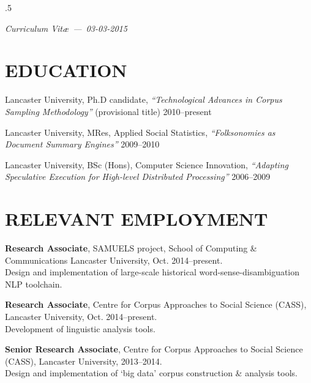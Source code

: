 \documentclass{res}
\begin{document}
\thispagestyle{empty} %
\address{\\
\texttt{<steve@stephenwattam.com>}\\
\texttt{http://stephenwattam.com/}}


\begin{resume}
\vspace{0.2in}
\moveleft.5\sectionwidth\centerline{\it Curriculum Vit\ae~---~03-03-2015}

\section{EDUCATION}
\vspace{0.1in}

    Lancaster University, Ph.D candidate,
    \textit{``Technological Advances in Corpus Sampling Methodology''} (provisional title)
    2010--present

    Lancaster University, MRes,
    Applied Social Statistics,
    \textit{``Folksonomies as Document Summary \mbox{Engines}''}
    2009--2010

    Lancaster University, BSc (Hons),
    Computer Science Innovation,
    \textit{``Adapting Speculative Execution for High-level Distributed Processing''}
    2006--2009



\section{RELEVANT EMPLOYMENT}
\vspace{0.1in}


    {\bf Research Associate},
    SAMUELS project, School of Computing \& Communications
    Lancaster University,
    Oct. 2014--present.\\
    Design and implementation of large-scale historical word-sense-disambiguation NLP toolchain.


    {\bf Research Associate},
    Centre for Corpus Approaches to Social Science (CASS),
    Lancaster University,
    Oct. 2014--present.\\
    Development of linguistic analysis tools.




    {\bf Senior Research Associate},
    Centre for Corpus Approaches to Social Science (CASS),
    Lancaster University,
    2013--2014.\\
    Design and implementation of `big data' corpus construction \& analysis tools.


\end{resume}
\end{document}
